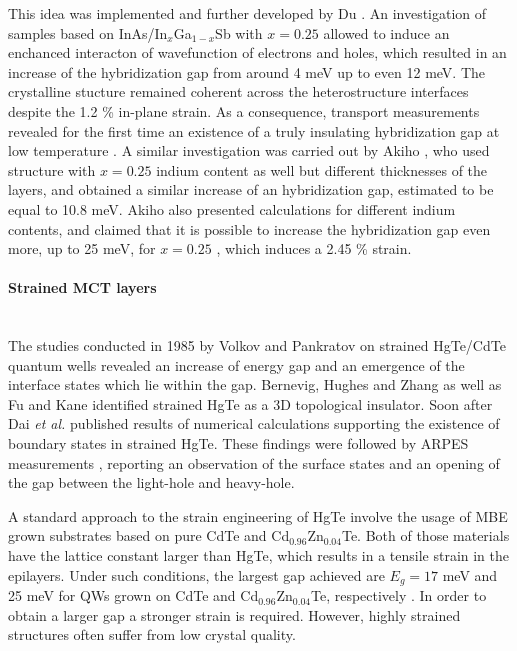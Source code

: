 \documentclass[titlepage,a4paper]{book}
\newcommand{\wciecie}{\quad\phantom{v}}
\newcommand{\myparagraph}[1]{\paragraph{#1}\mbox{}\\}
\begin{document}
This idea was implemented and further developed by Du \cite{Du_State2}. An investigation of samples based on InAs/In$_x$Ga$_{1-x}$Sb with $x = 0.25$ allowed to induce an enchanced interacton of wavefunction of electrons and holes, which resulted in an increase of the hybridization gap from around 4 meV up to even 12 meV. The crystalline stucture remained coherent across the heterostructure interfaces despite the 1.2 \% in-plane strain. As a consequence, transport measurements revealed for the first time an existence of a truly insulating hybridization gap at low temperature \cite{Du_State2}. A similar investigation was carried out by Akiho \cite{Akiho_State}, who used structure with $x = 0.25$ indium content as well but different thicknesses of the layers, and obtained a similar increase of an hybridization gap, estimated to be equal to 10.8 meV. Akiho also presented calculations for different indium contents, and claimed that it is possible to increase the hybridization gap even more, up to 25 meV, for $x = 0.25$ \cite{Akiho_State}, which induces a 2.45 \% strain.

\myparagraph{Strained MCT layers}
\wciecie
The studies conducted in 1985 by Volkov and Pankratov \cite{Volkow_strainedMCT} on strained HgTe/CdTe quantum wells revealed an increase of energy gap and an emergence of the interface states which lie within the gap. Bernevig, Hughes and Zhang \cite{Bernevig_Topology2} as well as Fu and Kane \cite{Kane_Fu} identified strained HgTe as a 3D topological insulator. Soon after Dai \textit{et al.} published results of numerical calculations supporting the existence of boundary states in strained HgTe. These findings were followed by ARPES measurements \cite{Brune_State} \cite{Crauste_StrainedMCT}, reporting an observation of the surface states and an opening of the gap between the light-hole and heavy-hole.
 
A standard approach to the strain engineering of HgTe involve the usage of MBE grown substrates based on pure CdTe and Cd$_{0.96}$Zn$_{0.04}$Te. Both of those materials have the lattice constant larger than HgTe, which results in a tensile strain in the epilayers. Under such conditions, the largest gap achieved are $E_g = 17$ meV and 25 meV for QWs grown on CdTe and Cd$_{0.96}$Zn$_{0.04}$Te, respectively \cite{Pfeuffer_State}. In order to obtain a larger gap a stronger strain is required. However, highly strained structures often suffer from low crystal quality. 
\end{document}
